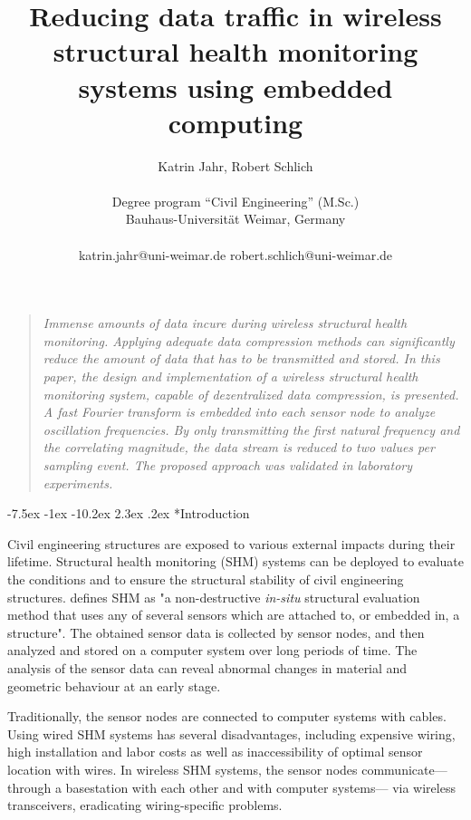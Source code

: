 \documentclass[12pt,a4paper]{scrartcl}
\title{\textbf{ \Large {Reducing data traffic in wireless structural health monitoring systems using embedded computing}}}
\author
{\large Katrin Jahr, Robert Schlich\\
\\
\normalsize{Degree program “Civil Engineering” (M.Sc.)}\\
\normalsize{Bauhaus-Universität Weimar, Germany}\\
\\
\normalsize{katrin.jahr@uni-weimar.de \qquad}
\normalsize{robert.schlich@uni-weimar.de}
}
\date{}
\makeatletter
\renewcommand\section{\@startsection{section}{1}{\z@}%
                     {-7.5ex \@plus -1ex \@minus -10.2ex}%
                     {2.3ex \@plus.2ex}%
                     {\sffamily\large\bfseries}}
\newenvironment{sciabstract}{%
\begin{quote} \itshape}
{\end{quote}}
\makeatother
\begin{document}
 


\baselineskip20pt


\maketitle 
\vspace{-2em}

% 
\setlength{\emergencystretch}{3pt}


\begin{sciabstract}
Immense amounts of data incure during wireless structural health monitoring.
Applying adequate data compression methods can significantly reduce the amount of data that has to be transmitted and stored.
In this paper, the design and implementation of a wireless structural health monitoring system, capable of dezentralized data compression, is presented. 
A fast Fourier transform is embedded into each sensor node to analyze oscillation frequencies. 
By only transmitting the first natural frequency and the correlating magnitude, the data stream is reduced to two values per sampling event.
The proposed approach was validated in laboratory experiments.

\end{sciabstract}


\section*{Introduction}

Civil engineering structures are exposed to various external impacts during their lifetime. 
Structural health monitoring (SHM) systems can be deployed to evaluate the conditions and to ensure the structural stability of civil engineering structures.
\citet{BisbySHM} defines SHM as "a non-destructive \textit{in-situ} structural evaluation method that uses any of several sensors which are attached to, or embedded in, a structure".
The obtained sensor data is collected by sensor nodes, and then analyzed and stored on a computer system over long periods of time. 
The analysis of the sensor data can reveal abnormal changes in material and geometric behaviour at an early stage.

Traditionally, the sensor nodes are connected to computer systems with cables.
Using wired SHM systems has several disadvantages, including expensive wiring, high installation and labor costs as well as inaccessibility of optimal sensor location with wires.
In wireless SHM systems, the sensor nodes communicate---through a basestation with each other and with computer systems--- via wireless transceivers, eradicating wiring-specific problems.
\end{document}
